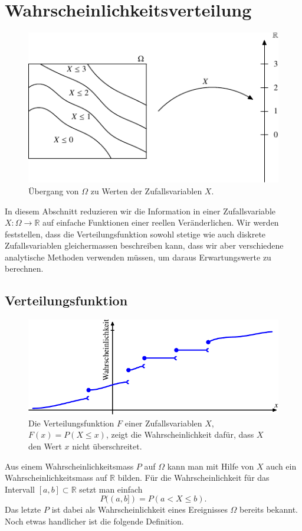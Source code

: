 \section{Wahrscheinlichkeitsverteilung}
\begin{figure}
\begin{center}
\includegraphics[width=0.7\hsize]{images/verteilungsfunktion-1}
\end{center}
\caption{Übergang von $\Omega$ zu Werten
der Zufallsvariablen $X$.
\label{bilduebergangzurverteilungsfunktion}}
\end{figure}
In diesem Abschnitt reduzieren wir die Information in einer Zufallsvariable
$X\colon\Omega\to\mathbb R$ auf einfache Funktionen einer reellen Veränderlichen.
Wir werden feststellen, dass die Verteilungsfunktion sowohl stetige wie auch
diskrete Zufallsvariablen gleichermassen beschreiben kann, dass wir
aber verschiedene analytische Methoden verwenden müssen, um daraus
Erwartungswerte zu berechnen.

\subsection{Verteilungsfunktion}
\begin{figure}
\begin{center}
\includegraphics{images/verteilungsfunktion-2}
\end{center}
\caption{Die Verteilungsfunktion $F$ einer Zufallsvariablen $X$,
$F(x)=P(X\le x)$, zeigt die Wahrscheinlichkeit dafür, dass $X$ den Wert $x$ nicht
überschreitet.
\label{bildverteilungsfunktion}}
\end{figure}
Aus einem Wahrscheinlichkeitsmass $P$ auf $\Omega$ kann man mit Hilfe
von $X$ auch ein Wahrscheinlichkeitsmass auf $\mathbb{R}$ bilden.
Für die
Wahrscheinlichkeit für das Intervall $[a,b]\subset\mathbb{R}$ setzt
man einfach
\[
P((a,b])=P(a< X\le b).
\]
Das letzte $P$ ist dabei als Wahrscheinlichkeit eines Ereignisses $\Omega$
bereits bekannt.
Noch etwas handlicher ist die folgende Definition.

